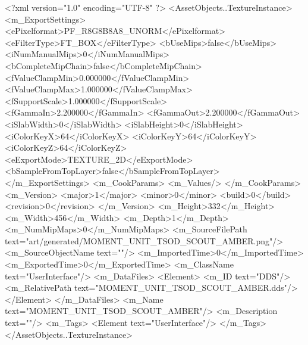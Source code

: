<?xml version="1.0" encoding="UTF-8" ?>
<AssetObjects..TextureInstance>
	<m_ExportSettings>
		<ePixelformat>PF_R8G8B8A8_UNORM</ePixelformat>
		<eFilterType>FT_BOX</eFilterType>
		<bUseMips>false</bUseMips>
		<iNumManualMips>0</iNumManualMips>
		<bCompleteMipChain>false</bCompleteMipChain>
		<fValueClampMin>0.000000</fValueClampMin>
		<fValueClampMax>1.000000</fValueClampMax>
		<fSupportScale>1.000000</fSupportScale>
		<fGammaIn>2.200000</fGammaIn>
		<fGammaOut>2.200000</fGammaOut>
		<iSlabWidth>0</iSlabWidth>
		<iSlabHeight>0</iSlabHeight>
		<iColorKeyX>64</iColorKeyX>
		<iColorKeyY>64</iColorKeyY>
		<iColorKeyZ>64</iColorKeyZ>
		<eExportMode>TEXTURE_2D</eExportMode>
		<bSampleFromTopLayer>false</bSampleFromTopLayer>
	</m_ExportSettings>
	<m_CookParams>
		<m_Values/>
	</m_CookParams>
	<m_Version>
		<major>1</major>
		<minor>0</minor>
		<build>0</build>
		<revision>0</revision>
	</m_Version>
	<m_Height>332</m_Height>
	<m_Width>456</m_Width>
	<m_Depth>1</m_Depth>
	<m_NumMipMaps>0</m_NumMipMaps>
	<m_SourceFilePath text="art/generated/MOMENT_UNIT_TSOD_SCOUT_AMBER.png"/>
	<m_SourceObjectName text=""/>
	<m_ImportedTime>0</m_ImportedTime>
	<m_ExportedTime>0</m_ExportedTime>
	<m_ClassName text="UserInterface"/>
	<m_DataFiles>
		<Element>
			<m_ID text="DDS"/>
			<m_RelativePath text="MOMENT_UNIT_TSOD_SCOUT_AMBER.dds"/>
		</Element>
	</m_DataFiles>
	<m_Name text="MOMENT_UNIT_TSOD_SCOUT_AMBER"/>
	<m_Description text=""/>
	<m_Tags>
		<Element text="UserInterface"/>
	</m_Tags>
</AssetObjects..TextureInstance>

